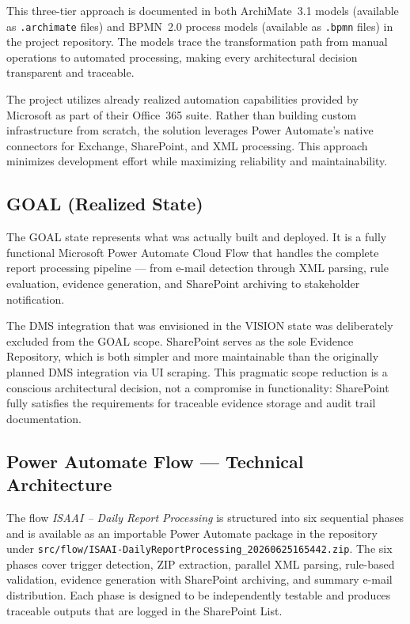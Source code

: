 \documentclass[11pt,a4paper]{article}
\begin{document}
This three-tier approach is documented in both ArchiMate~3.1 models (available as \texttt{.archimate} files) and BPMN~2.0 process models (available as \texttt{.bpmn} files) in the project repository. The models trace the transformation path from manual operations to automated processing, making every architectural decision transparent and traceable.

The project utilizes already realized automation capabilities provided by Microsoft as part of their Office~365 suite. Rather than building custom infrastructure from scratch, the solution leverages Power Automate's native connectors for Exchange, SharePoint, and XML processing. This approach minimizes development effort while maximizing reliability and maintainability.

\subsection{GOAL (Realized State)}

The GOAL state represents what was actually built and deployed. It is a fully functional Microsoft Power Automate Cloud Flow that handles the complete report processing pipeline --- from e-mail detection through XML parsing, rule evaluation, evidence generation, and SharePoint archiving to stakeholder notification.

The DMS integration that was envisioned in the VISION state was deliberately excluded from the GOAL scope. SharePoint serves as the sole Evidence Repository, which is both simpler and more maintainable than the originally planned DMS integration via UI scraping. This pragmatic scope reduction is a conscious architectural decision, not a compromise in functionality: SharePoint fully satisfies the requirements for traceable evidence storage and audit trail documentation.

\subsection{Power Automate Flow --- Technical Architecture}

The flow \emph{ISAAI -- Daily Report Processing} is structured into six sequential phases and is available as an importable Power Automate package in the repository under \texttt{src/flow/ISAAI-Daily\-Report\-Processing\_20260625165442.zip}. The six phases cover trigger detection, ZIP extraction, parallel XML parsing, rule-based validation, evidence generation with SharePoint archiving, and summary e-mail distribution. Each phase is designed to be independently testable and produces traceable outputs that are logged in the SharePoint List.
\end{document}
